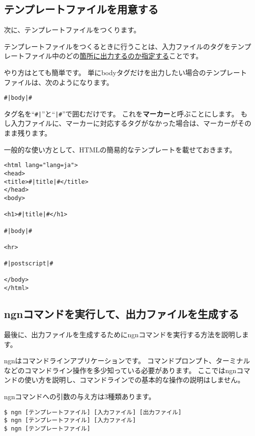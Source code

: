 \documentclass[a4j]{jsarticle}
\begin{document}
\subsection{テンプレートファイルを用意する}

次に、テンプレートファイルをつくります。

テンプレートファイルをつくるときに行うことは、入力ファイルのタグをテンプレートファイル中のどの\underline{箇所に出力するのか指定する}ことです。

やり方はとても簡単です。
単にbodyタグだけを出力したい場合のテンプレートファイルは、次のようになります。

\begin{lstlisting}[caption=bodyタグのみが出力されるテンプレート]
#|body|#
\end{lstlisting}

タグ名を``\verb&#|&''と``\verb&|#&''で囲むだけです。
これを\textbf{マーカー}と呼ぶことにします。
もし入力ファイルに、マーカーに対応するタグがなかった場合は、マーカーがそのまま残ります。

一般的な使い方として、HTMLの簡易的なテンプレートを載せておきます。

\begin{lstlisting}[caption=HTMLのテンプレート]
<html lang="lang=ja">
<head>
<title>#|title|#</title>
</head>
<body>

<h1>#|title|#</h1>

#|body|#

<hr>

#|postscript|#

</body>
</html>
\end{lstlisting}


\subsection{ngnコマンドを実行して、出力ファイルを生成する}

最後に、出力ファイルを生成するためにngnコマンドを実行する方法を説明します。

ngnはコマンドラインアプリケーションです。
コマンドプロンプト、ターミナルなどのコマンドライン操作を多少知っている必要があります。
ここではngnコマンドの使い方を説明し、コマンドラインでの基本的な操作の説明はしません。

ngnコマンドへの引数の与え方は3種類あります。

\begin{lstlisting}[caption=ngnの引数]
$ ngn [テンプレートファイル] [入力ファイル] [出力ファイル]
$ ngn [テンプレートファイル] [入力ファイル]
$ ngn [テンプレートファイル]
\end{lstlisting}
\end{document}
